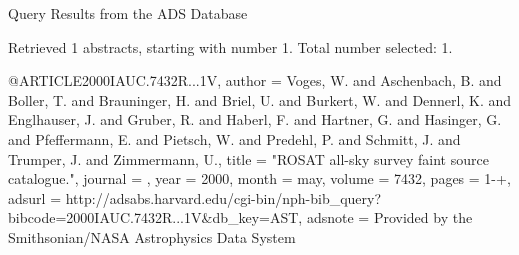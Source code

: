 Query Results from the ADS Database


Retrieved 1 abstracts, starting with number 1.  Total number selected: 1.

@ARTICLE{2000IAUC.7432R...1V,
   author = {{Voges}, W. and {Aschenbach}, B. and {Boller}, T. and {Brauninger}, H. and 
	{Briel}, U. and {Burkert}, W. and {Dennerl}, K. and {Englhauser}, J. and 
	{Gruber}, R. and {Haberl}, F. and {Hartner}, G. and {Hasinger}, G. and 
	{Pfeffermann}, E. and {Pietsch}, W. and {Predehl}, P. and {Schmitt}, J. and 
	{Trumper}, J. and {Zimmermann}, U.},
    title = "{ROSAT all-sky survey faint source catalogue.}",
  journal = {\iaucirc},
     year = 2000,
    month = may,
   volume = 7432,
    pages = {1-+},
   adsurl = {http://adsabs.harvard.edu/cgi-bin/nph-bib_query?bibcode=2000IAUC.7432R...1V&db_key=AST},
  adsnote = {Provided by the Smithsonian/NASA Astrophysics Data System}
}


